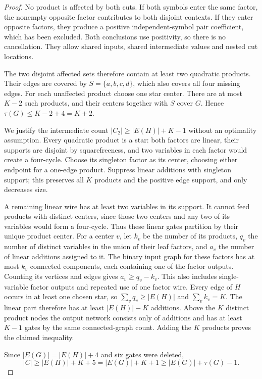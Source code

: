 \begin{proof}
No product is affected by both cuts. If both symbols enter the same factor, the nonempty opposite factor contributes to both disjoint contexts. If they enter opposite factors, they produce a positive independent-symbol pair coefficient, which has been excluded. Both conclusions use positivity, so there is no cancellation. They allow shared inputs, shared intermediate values and nested cut locations.

The two disjoint affected sets therefore contain at least two quadratic products. Their edges are covered by $S=\{a,b,c,d\}$, which also covers all four missing edges. For each unaffected product choose one star center. There are at most $K-2$ such products, and their centers together with $S$ cover $G$. Hence $\tau(G)\le K-2+4=K+2$.

We justify the intermediate count $|C_2|\ge |E(H)|+K-1$ without an optimality assumption. Every quadratic product is a star: both factors are linear, their supports are disjoint by squarefreeness, and two variables in each factor would create a four-cycle. Choose its singleton factor as its center, choosing either endpoint for a one-edge product. Suppress linear additions with singleton support; this preserves all $K$ products and the positive edge support, and only decreases size.

A remaining linear wire has at least two variables in its support. It cannot feed products with distinct centers, since those two centers and any two of its variables would form a four-cycle. Thus these linear gates partition by their unique product center. For a center $v$, let $k_v$ be the number of its products, $q_v$ the number of distinct variables in the union of their leaf factors, and $a_v$ the number of linear additions assigned to it. The binary input graph for these factors has at most $k_v$ connected components, each containing one of the factor outputs. Counting its vertices and edges gives $a_v\ge q_v-k_v$. This also includes single-variable factor outputs and repeated use of one factor wire. Every edge of $H$ occurs in at least one chosen star, so $\sum_vq_v\ge|E(H)|$ and $\sum_vk_v=K$. The linear part therefore has at least $|E(H)|-K$ additions. Above the $K$ distinct product nodes the output network consists only of additions and has at least $K-1$ gates by the same connected-graph count. Adding the $K$ products proves the claimed inequality.

Since $|E(G)|=|E(H)|+4$ and six gates were deleted,
\[
 |C|\ge |E(H)|+K+5
       =|E(G)|+K+1
       \ge |E(G)|+\tau(G)-1.
\]
\end{proof}

